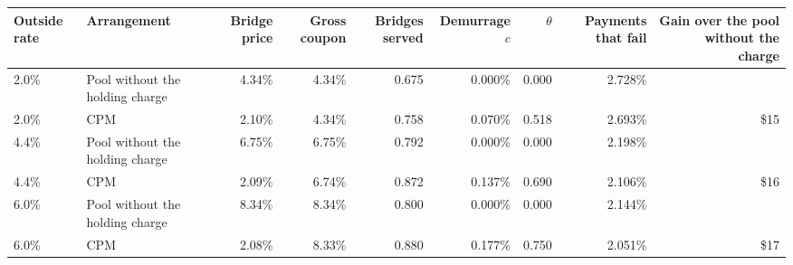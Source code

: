 \begin{tabular}{llrrrrrrr}
\toprule
Outside rate & Arrangement & Bridge price & Gross coupon & Bridges served & Demurrage $c$ & $\theta$ & Payments that fail & Gain over the pool without the charge \\
\midrule
2.0\% & Pool without the holding charge & 4.34\% & 4.34\% & 0.675 & 0.000\% & 0.000 & 2.728\% &  \\
2.0\% & CPM & 2.10\% & 4.34\% & 0.758 & 0.070\% & 0.518 & 2.693\% & \$15 \\
4.4\% & Pool without the holding charge & 6.75\% & 6.75\% & 0.792 & 0.000\% & 0.000 & 2.198\% &  \\
4.4\% & CPM & 2.09\% & 6.74\% & 0.872 & 0.137\% & 0.690 & 2.106\% & \$16 \\
6.0\% & Pool without the holding charge & 8.34\% & 8.34\% & 0.800 & 0.000\% & 0.000 & 2.144\% &  \\
6.0\% & CPM & 2.08\% & 8.33\% & 0.880 & 0.177\% & 0.750 & 2.051\% & \$17 \\
\bottomrule
\end{tabular}

